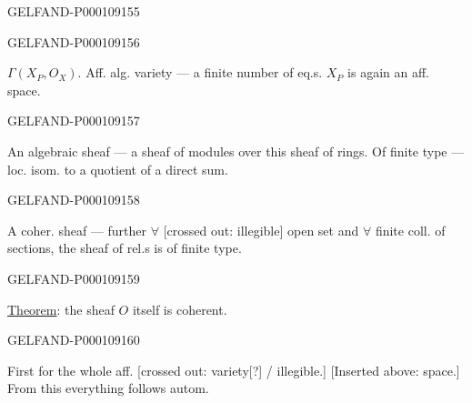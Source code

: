 \begin{GelfandAdjacentEvidence}{GELFAND-P000109}{155}

\end{GelfandAdjacentEvidence}
\begin{GelfandAdjacentEvidence}{GELFAND-P000109}{156}


$\Gamma(X_P,O_X)$. Aff. alg. variety — a finite number of eq.s.
$X_P$ is again an aff. space.
\end{GelfandAdjacentEvidence}
\begin{GelfandAdjacentEvidence}{GELFAND-P000109}{157}


An algebraic sheaf — a sheaf of modules over this sheaf of rings.
Of finite type — loc. isom. to a quotient of a direct sum.
\end{GelfandAdjacentEvidence}
\begin{GelfandAdjacentEvidence}{GELFAND-P000109}{158}

A coher. sheaf — further $\forall$ [crossed out: illegible] open set and $\forall$ finite coll. of sections, the sheaf of rel.s is of finite type.
\end{GelfandAdjacentEvidence}
\begin{GelfandAdjacentEvidence}{GELFAND-P000109}{159}

\underline{Theorem}: the sheaf $O$ itself is coherent.
\end{GelfandAdjacentEvidence}
\begin{GelfandAdjacentEvidence}{GELFAND-P000109}{160}


First for the whole aff. [crossed out: variety[?] / illegible.] [Inserted above: space.] From this everything follows autom.
\end{GelfandAdjacentEvidence}
